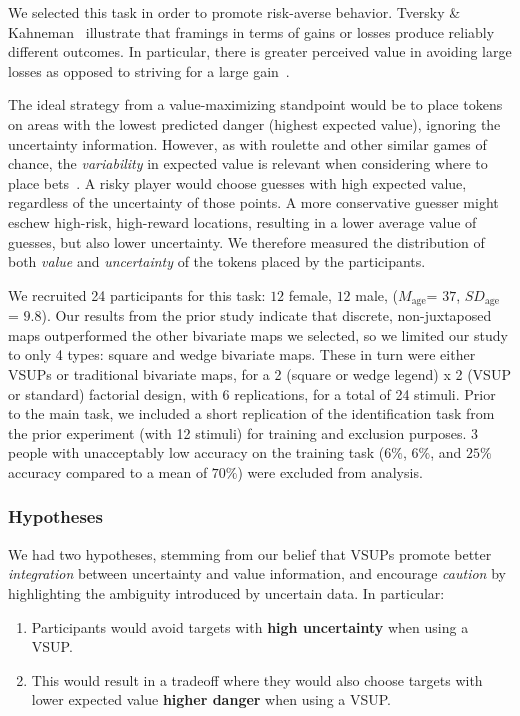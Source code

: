 We selected this task in order to promote risk-averse behavior. Tversky \& Kahneman~\cite{tversky1985framing} illustrate that framings in terms of gains or losses produce reliably different outcomes. In particular, there is greater perceived value in avoiding large losses as opposed to striving for a large gain~\cite{kahneman1979prospect}. 

The ideal strategy from a value-maximizing standpoint would be to place tokens on areas with the lowest predicted danger (highest expected value), ignoring the uncertainty information. However, as with roulette and other similar games of chance, the \emph{variability} in expected value is relevant when considering where to place bets~\cite{mlodinow2009drunkard}. A risky player would choose guesses with high expected value, regardless of the uncertainty of those points. A more conservative guesser might eschew high-risk, high-reward locations, resulting in a lower average value of guesses, but also lower uncertainty. We therefore measured the distribution of both \emph{value} and \emph{uncertainty} of the tokens placed by the participants.

 We recruited 24 participants for this task: $12$ female, $12$ male, ($M_{\text{age}}$= $37$, $SD_{\text{age}}$ = $9.8$). Our results from the prior study indicate that discrete, non-juxtaposed maps outperformed the other bivariate maps we selected, so we limited our study to only 4 types: square and wedge bivariate maps. These in turn were either VSUPs or traditional bivariate maps, for a 2 (square or wedge legend) x 2 (VSUP or standard) factorial design, with 6 replications, for a total of 24 stimuli. Prior to the main task, we included a short replication of the identification task from the prior experiment (with 12 stimuli) for training and exclusion purposes. 3 people with unacceptably low accuracy on the training task ($6\%$, $6\%$, and $25\%$ accuracy compared to a mean of $70\%$) were excluded from analysis. 

\subsubsection{Hypotheses}

We had two hypotheses, stemming from our belief that VSUPs promote better \emph{integration} between uncertainty and value information, and encourage \emph{caution} by highlighting the ambiguity introduced by uncertain data. In particular:
\begin{enumerate}
	\item Participants would avoid targets with \textbf{high uncertainty} when using a VSUP.
	\item This would result in a tradeoff where they would also choose targets with lower expected value \textbf{higher danger} when using a VSUP.
\end{enumerate}

